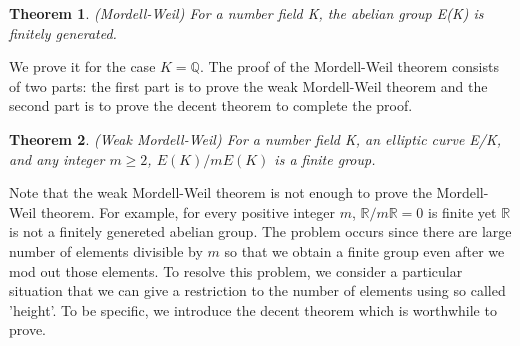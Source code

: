 \documentclass[12pt]{article}
\newcommand{\<}{\langle}
\renewcommand{\>}{\rangle}
\numberwithin{equation}{section}
\theoremstyle{plain}
\newtheorem{thm}{Theorem}[section]
\theoremstyle{definition}
\begin{document}
\begin{thm} 
    (Mordell-Weil) For a number field K, the abelian group E(K) is finitely generated.
\end{thm}

We prove it for the case \(K = \mathbb{Q}\). The proof of the Mordell-Weil theorem consists of two parts: the first part is to prove the weak Mordell-Weil theorem and the second part is to prove the decent theorem to complete the proof.


\begin{thm}
    (Weak Mordell-Weil) For a number field K, an elliptic curve E/K, and any integer \(m \geq 2\), \(E(K)/mE(K)\) is a finite group. 
\end{thm}

Note that the weak Mordell-Weil theorem is not enough to prove the Mordell-Weil theorem. For example, for every positive integer \(m\), \(\mathbb{R}/m\mathbb{R}=0\) is finite yet \( \mathbb{R} \) is not a finitely genereted abelian group. The problem occurs since there are large number of elements divisible by \(m\) so that we obtain a finite group even after we mod out those elements. To resolve this problem, we consider a particular situation that we can give a restriction to the number of elements using so called 'height'. To be specific, we introduce the decent theorem which is worthwhile to prove.
\end{document}
